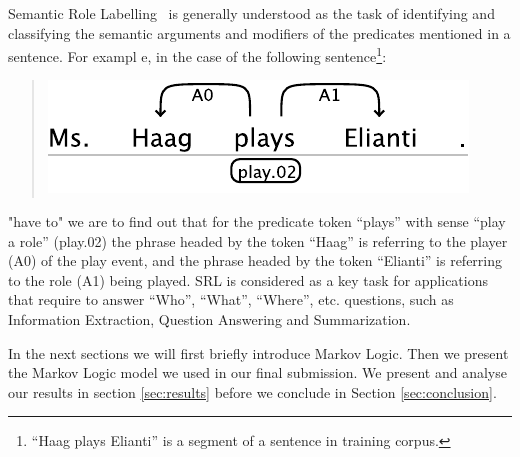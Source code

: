 
Semantic Role Labelling~\citep[SRL, ][]{marquez08srl} is generally understood as 
the task of identifying and classifying the semantic arguments and modifiers of 
the predicates mentioned in a sentence. For exampl
e, in the case of the following sentence\footnote{``Haag plays Elianti'' is a 
segment of a sentence in training corpus.}:
\begin{quote}
\begin{center}
    \includegraphics[scale=.63]{haag-example}
\end{center}
\end{quote}
"have to" we are to find out that for the predicate token {}``plays'' with sense 
``play a role'' (play.02) the phrase headed by the token {}``Haag'' is referring 
to the player (A0) of the play event, and the phrase headed by the token 
{}``Elianti''  is referring to the role (A1) being played. SRL is considered as 
a key task for applications that require to answer {}``Who'', {}``What'', 
{}``Where'', etc. questions, such as Information Extraction, Question Answering 
and Summarization. 

In the next sections we will first briefly introduce Markov Logic. Then we 
present the Markov Logic model we used in our final submission. We present and 
analyse our results in section \ref{sec:results} before we conclude in Section 
\ref{sec:conclusion}.


